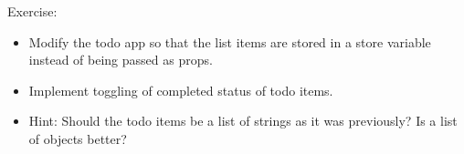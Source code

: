 \documentclass[presentation]{beamer}
\begin{document}
\begin{frame}[label=sec-9]{Exercise:}
\begin{itemize}
\item Modify the todo app so that the list items are stored in a store variable
instead of being passed as props.
\item Implement toggling of completed status of todo items.
\item Hint: Should the todo items be a list of strings as it was previously? Is a
list of objects better?
\end{itemize}
\end{frame}
\end{document}
